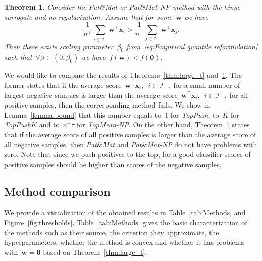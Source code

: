 \documentclass[11pt,a4paper]{article}
\newtheorem{theorem}[thm]{Theorem}
\theoremstyle{definition}
\newcommand{\I}{\mathcal{I}}
\newcommand{\toppush}{\textit{TopPush}\xspace}
\newcommand{\toppushk}{\textit{TopPush$K$}\xspace}
\newcommand{\patmat}{\textit{Pat}\textup{\&}\textit{Mat}\xspace}
\newcommand{\patmatnp}{\textit{Pat}\textup{\&}\textit{Mat-NP}\xspace}
\newcommand{\topmeannp}{\textit{TopMean-NP}\xspace}
\begin{document}
\begin{theorem}\label{thm:patmat_zero}
  Consider the \patmat or \patmatnp method with the hinge surrogate and no regularization. Assume that for some~$\bm{w}$ we have
  \begin{equation*}
    \frac{1}{n^+}\sum_{i \in \I^+}\bm{w}^\top \bm{x}_i > \frac{1}{n^-} \sum_{j \in \I^-}\bm{w}^\top \bm{x}_j.
  \end{equation*}
  Then there exists scaling parameter~$\beta_0$ from~\eqref{eq:Empirical quantile reformulation} such that~$\forall\beta\in(0,\beta_0)$ we have~$f(\bm{w})<f(\bm{0}).$
\end{theorem}

We would like to compare the results of Theorems~\ref{thm:large_t} and~\ref{thm:patmat_zero}. The former states that if the average score~$\bm{w}^\top \bm{x}_i,$~$i \in \I^-,$ for a small number of largest negative samples is larger than the average score~$\bm{w}^\top \bm{x}_i,$~$i \in \I^+,$ for all positive samples, then the corresponding method fails. We show in Lemma~\ref{lemma:bound} that this number equals to~$1$ for \toppush, to~$K$ for \toppushk and to~$n^-\tau$ for \topmeannp. On the other hand, Theorem~\ref{thm:patmat_zero} states that if the average score of all positive samples is larger than the average score of all negative samples, then \patmat and \patmatnp do not have problems with zero. Note that since we push positives to the top, for a good classifier scores of positive samples should be higher than scores of the negative samples.

 
\subsection{Method comparison}

We provide a visualization of the obtained results in Table~\ref{tab:Methods} and Figure~\ref{fig:thresholds}. Table~\ref{tab:Methods} gives the basic characterization of the methods such as their source, the criterion they approximate, the hyperparameters, whether the method is convex and whether it has problems with~$\bm{w} = \bm{0}$ based on Theorem~\ref{thm:large_t}.
\end{document}
